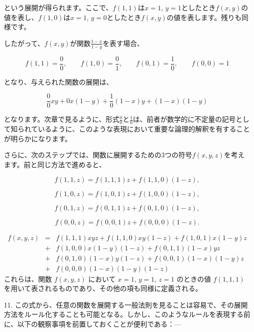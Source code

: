 \documentclass[a4paper,11pt,openany]{ltjsbook}
\begin{document}
という展開が得られます。ここで、$f(1, 1)$は$x=1$, $y=1$としたとき$f(x, y)$の値を表し、$f(1, 0)$は$x=1$, $y=0$としたとき$f(x, y)$の値を表します。残りも同様です。

したがって、$f(x, y)$が関数$\frac{1-x}{1-y}$を表す場合、

\[
f(1, 1) = \frac{0}{0},\qquad%
f(1, 0) = \frac{0}{1},\qquad%
f(0, 1) = \frac{1}{0},\qquad%
f(0, 0) = 1
\]

となり、与えられた関数の展開は、

\[
\frac{0}{0}xy + 0x(1-y) + \frac{1}{0}(1-x)y + (1-x)(1-y)
\]

となります。次章で見るように、形式$\frac{0}{0}$と$\frac{1}{0}$は、前者が数学的に不定量の記号として知られているように、このような表現において重要な論理的解釈を有することが明らかになります。

さらに、次のステップでは、関数に展開するための3つの符号$f(x, y, z)$を考えます。前と同じ方法で進めると、

\begin{equation}
f(1, 1, z) = f(1, 1, 1)z + f(1, 1, 0)(1 - z),
\end{equation}

\begin{equation}
f(1, 0, z) = f(1, 0, 1)z + f(1, 0, 0)(1 - z),
\end{equation}

\begin{equation}
f(0, 1, z) = f(0, 1, 1)z + f(0, 1, 0)(1 - z),
\end{equation}

\begin{equation}
f(0, 0, z) = f(0, 0, 1)z + f(0, 0, 0)(1 - z).
\end{equation}

\begin{eqnarray*}
f(x,y,z) &=& f(1,1,1)xyz + f(1,1,0)xy(1-z) + f(1, 0, 1)x(1-y)z \\
         &+& f(1,0,0)x(1-y)(1-z) + f(0,1,1)(1-x)yz\\
         &+& f(0,1,0)(1-x)y(1-z) + f(0,0,1)(1-x)(1-y)z\\
         &+& f(0,0,0)(1-x)(1-y)(1-z)
\end{eqnarray*}
これらは、関数 $f(x,y,z)$ において $x=1$, $y=1$, $z=1$ のときの値 $f(1,1,1)$ を用いて表されるものであり、その他の項も同様に定義される。

11. この式から、任意の関数を展開する一般法則を見ることは容易で、その展開方法をルール化することも可能となる。しかし、このようなルールを表現する前に、以下の観察事項を前置しておくことが便利である：---
\end{document}
